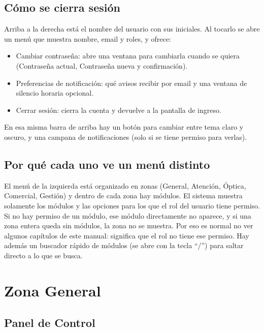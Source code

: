 \subsection{Cómo se cierra sesión}
\label{sec:mu-cerrar-sesion}

Arriba a la derecha está el nombre del usuario con sus iniciales. Al tocarlo se abre un menú que muestra nombre, email y roles, y ofrece:

\begin{itemize}
  \item Cambiar contraseña: abre una ventana para cambiarla cuando se quiera (Contraseña actual, Contraseña nueva y confirmación).
  \item Preferencias de notificación: qué avisos recibir por email y una ventana de silencio horaria opcional.
  \item Cerrar sesión: cierra la cuenta y devuelve a la pantalla de ingreso.
\end{itemize}

En esa misma barra de arriba hay un botón para cambiar entre tema claro y oscuro, y una campana de notificaciones (solo si se tiene permiso para verlas).

\subsection{Por qué cada uno ve un menú distinto}
\label{sec:mu-menu-distinto}

El menú de la izquierda está organizado en zonas (General, Atención, Óptica, Comercial, Gestión) y dentro de cada zona hay módulos. El sistema muestra solamente los módulos y las opciones para los que el rol del usuario tiene permiso. Si no hay permiso de un módulo, ese módulo directamente no aparece, y si una zona entera queda sin módulos, la zona no se muestra. Por eso es normal no ver algunos capítulos de este manual: significa que el rol no tiene ese permiso. Hay además un buscador rápido de módulos (se abre con la tecla ``/'') para saltar directo a lo que se busca.

\section{Zona General}
\label{sec:mu-zona-general}

\subsection{Panel de Control}
\label{sec:mu-panel-control}

